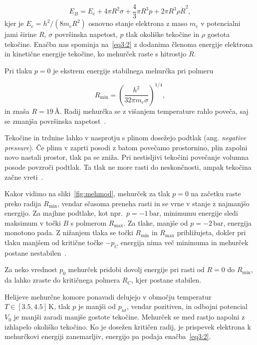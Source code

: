 \[  E_B = E_{e} + 4 \pi R ^2 \sigma + \frac{4}{3} \pi R ^3 p + 2 \pi R ^3 \rho \dot{R} ^2,
\]
kjer je \( E_e = h ^2 / {\left(8 m_e R ^2\right)} \) osnovno stanje elektrona z maso \( m_e \) v potencialni jami širine \( R \), \( \sigma \) površinska napetost, \( p \) tlak okoliške tekočine in \( \rho \) gostota tekočine. Enačba nas spominja na~\eqref{eq3:2} z dodanima členoma energije elektrona in kinetične energije tekočine, ko mehurček raste s hitrostjo \( \dot{R} \).

Pri tlaku \( p = 0 \) je ekstrem energije stabilnega mehurčka pri polmeru

\[  R_{\min} = {\left( \frac{h ^2}{32 \pi m_e \sigma} \right)}^{1/4},
\]
in znaša \( R = 19 \, \si{\angstrom} \). Radij mehurčka se z višanjem temperature rahlo poveča, saj se zmanjša površinska napetost~\cite{classen_electrons_1998}. 

Tekočine in trdnine lahko v nasprotju s plinom dosežejo podtlak (ang. \textit{negative pressure}). Če plinu v zaprti posodi z batom povečamo prostornino, plin zapolni novo nastali prostor, tlak pa se zniža. Pri nestisljivi tekočini povečanje volumna posode povzroči podtlak. Ta tlak ne more rasti do neskončnosti, ampak tekočina začne vreti~\cite{imre_how_2007}.

\begin{slika}[H]
  \centering
  
  \caption{\small Energija mehurčka v odvisnosti od polmera \( R \) in različnih vrednosti za tlak, ob površinski napetosti \( \sigma = 0.3544 \cdot 10^{-7} \, \mathrm{J} / \mathrm{cm} ^2 \) za helij~\cite{classen_electrons_1998}. Točka \( A \) je minimum energije in točka \( B \) pa njen maksimum za \( p = -1 \, \mathrm{bar} \). Jasno se vidi monotono padanje energije za dovolj negativne vrednosti \( p \).}\label{fig:mehmod}
\end{slika}

Kakor vidimo na sliki~\ref{fig:mehmod}, mehurček za tlak \( p = 0 \) na začetku raste preko radija \( R_{\min} \), vendar sčasoma preneha rasti in se vrne v stanje z najmanjšo energijo. Za majhne podtlake, kot npr.~\( p = -1\, \mathrm{bar}\), minimumu energije sledi maksimum v točki \( B \) s polmerom \( R_{\max} \). Za tlake, manjše od \( p = -2\, \mathrm{bar} \), energija monotono pada. Z nižanjem tlaka se točki \( R_{\min} \) in \( R_{\max} \) približujeta, dokler pri tlaku manjšem od kritične točke \( -p_C \) energija nima več minimuma in mehurček postane nestabilen~\cite{classen_electrons_1998}.

Za neko vrednost \( p_0 \) mehurček pridobi dovolj energije pri rasti od \( R = 0 \) do \( R_{\min} \), da lahko zraste do kritičnega polmera \( R_C \), kjer postane stabilen.

Helijeve mehurčne komore ponavadi delujejo v območju temperatur \( T \in [3.5, 4.5] \, \mathrm{K} \), tlak \( p \) je manjši od \( p_{nt} \), vendar pozitiven, in odbojni potencial \( V_0 \) je manjši zaradi manjše gostote tekočine. Mehurček se med rastjo napolni z izhlapelo okoliško tekočino. Ko je dosežen kritičen radij, je prispevek elektrona k mehurčkovi energiji zanemarljiv, energijo pa podaja enačba~\eqref{eq3:2}.


